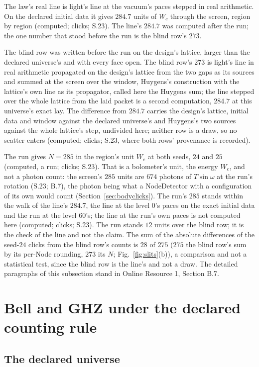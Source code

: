 \documentclass[pdflatex,sn-mathphys-num]{sn-jnl}
\newcommand{\Wc}{W_c}
\theoremstyle{thmstyleone}
\theoremstyle{thmstyletwo}
\begin{document}
The law's real line is light's line at the vacuum's paces stepped in real arithmetic. On the declared initial data it gives $284.7$ units of $\Wc$ through the screen, region by region (computed; clicks; S.23). The line's $284.7$ was computed after the run; the one number that stood before the run is the blind row's $273$.

The blind row was written before the run on the design's lattice, larger than the declared universe's and with every face open. The blind row's $273$ is light's line in real arithmetic propagated on the design's lattice from the two gaps as its sources and summed at the screen over the window, Huygens's construction with the lattice's own line as its propagator, called here the Huygens sum; the line stepped over the whole lattice from the laid packet is a second computation, $284.7$ at this universe's exact lay. The difference from $284.7$ carries the design's lattice, initial data and window against the declared universe's and Huygens's two sources against the whole lattice's step, undivided here; neither row is a draw, so no scatter enters (computed; clicks; S.23, where both rows' provenance is recorded).

The run gives $N = 285$ in the region's unit $\Wc$ at both seeds, $24$ and $25$ (computed, a run; clicks; S.23). That is a bolometer's unit, the energy $\Wc$, and not a photon count: the screen's $285$ units are $674$ photons of $T\sin\omega$ at the run's rotation (S.23; B.7), the photon being what a NodeDetector with a configuration of its own would count (Section~\ref{sec:bodyclicks}). The run's $285$ stands within the walk of the line's $284.7$, the line at the level $0$'s paces on the exact initial data and the run at the level $60$'s; the line at the run's own paces is not computed here (computed; clicks; S.23). The run stands $12$ units over the blind row; it is the check of the line and not the claim. The sum of the absolute differences of the seed-$24$ clicks from the blind row's counts is $28$ of $275$ ($275$ the blind row's sum by its per-Node rounding, $273$ its $N$; Fig.~\ref{fig:slits}(b)), a comparison and not a statistical test, since the blind row is the line's and not a draw. The detailed paragraphs of this subsection stand in Online Resource 1, Section B.7.
\section{Bell and GHZ under the declared counting rule}\label{sec:bell}

\subsection{The declared universe}\label{sec:bell-file}
\end{document}
